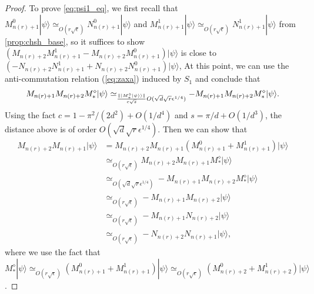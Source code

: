 \documentclass[11pt,letterpaper]{article}
\newcommand{\ket}[1]{|#1\rangle}
\DeclarePairedDelimiter{\norm}{\lVert}{\rVert}
\newcommand{\1}{\mathbb{1}}
\newcommand{\nr}{n(r)}
\newcommand{\se}{\sqrt{\epsilon}}
\newcommand{\qe}{\epsilon^{1/4}}
\newcommand{\sd}{\sqrt{d}}
\newcommand{\sr}{\sqrt{r}}
\newcommand{\appd}[1]{\simeq_{#1}}
\theoremstyle{definition}
\begin{document}
\begin{proof}
	To prove \cref{eq:psi1_eq}, 
	we first recall that $M_{\nr+1}^0 \ket{\psi} \appd{O(r\se)} N_{\nr+1}^0 \ket{\psi}$ 
	and $M_{\nr+1}^1 \ket{\psi} \appd{O(r\se)} N_{\nr+1}^1 \ket{\psi}$ from \cref{prop:chsh_base},
	so it suffices to show
	$(M_{\nr+2}M_{\nr+1}^1 - M_{\nr+2}M_{\nr+1}^0) \ket{\psi}$ is close to $(- N_{\nr+2}N_{\nr+1}^1+N_{\nr+2}N_{\nr+1}^0)\ket{\psi}$,
	At this point, we can use the anti-commutation relation (\cref{eq:zaxa}) induced by $S_1$  and conclude that 
	\begin{align*}
		M_{\nr+1}M_{\nr+2} M_\ast^\diamond \ket{\psi} \appd{\frac{\norm{\ket{M_\ast^\diamond\ket{\psi}}}}{c\sqrt{s}}O(\sd\sr\qe)} -M_{\nr+1}M_{\nr+2} M_\ast^\diamond \ket{\psi}.
	\end{align*}
	Using the fact $c = 1 - \pi^2/(2d^2) + O(1/d^4)$ and $s = \pi/d + O(1/d^3)$, the distance above is of order $O(\sd \sr \qe)$.
	Then we can show that 
	\begin{align*}
		M_{\nr+2}M_{\nr+1}\ket{\psi} &= M_{\nr+2}M_{\nr+1}(M_{\nr+1}^0 + M_{\nr+1}^1)\ket{\psi} \\
			&\appd{O(r\se)} M_{\nr+2}M_{\nr+1} M_\ast^\diamond \ket{\psi} \\
			&\appd{O(\sd \sr \qe)} -M_{\nr+1}M_{\nr+2} M_\ast^\diamond \ket{\psi}\\
			&\appd{O(r\se)} -M_{\nr+1}M_{\nr+2} \ket{\psi} \\
			&\appd{O(r\se)} -M_{\nr+1} N_{\nr+2} \ket{\psi} \\
			&\appd{O(r\se)} -N_{\nr+2} N_{\nr+1} \ket{\psi},
	\end{align*}
	where we use the fact that $M_\ast^\diamond \ket{\psi} \appd{O(r\se)} (M_{\nr+1}^0+M_{\nr+1}^1)\ket{\psi} \appd{O(r\se)}
	(M_{\nr+2}^0+M_{\nr+2}^1) \ket{\psi}$.


\end{proof}
\end{document}
